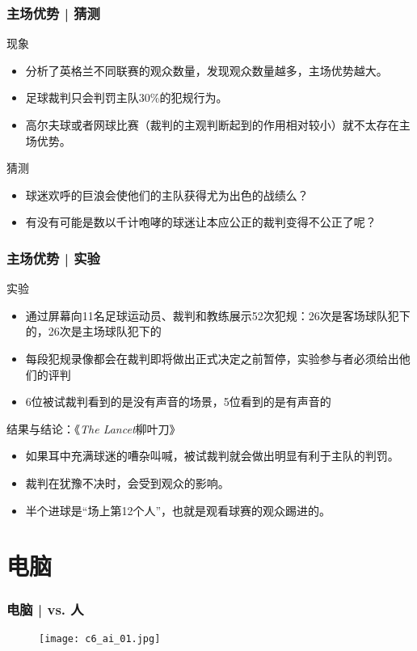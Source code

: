 \begin{frame}
  \frametitle{主场优势 | 猜测}
  \begin{block}{现象}
    \begin{itemize}
      \item 分析了英格兰不同联赛的观众数量，发现观众数量越多，主场优势越大。
      \item 足球裁判只会判罚主队30\%的犯规行为。
      \item 高尔夫球或者网球比赛（裁判的主观判断起到的作用相对较小）就不太存在主场优势。
    \end{itemize}
  \end{block}
  \pause
  \begin{block}{猜测}
    \begin{itemize}
      \item 球迷欢呼的巨浪会使他们的主队获得尤为出色的战绩么？
      \item 有没有可能是数以千计咆哮的球迷让本应公正的裁判变得不公正了呢？
    \end{itemize}
  \end{block}
\end{frame}

\begin{frame}
  \frametitle{主场优势 | 实验}
  \begin{block}{实验}
    \begin{itemize}
      \item 通过屏幕向11名足球运动员、裁判和教练展示52次犯规：26次是客场球队犯下的，26次是主场球队犯下的
      \item 每段犯规录像都会在裁判即将做出正式决定之前暂停，实验参与者必须给出他们的评判
      \item 6位被试裁判看到的是没有声音的场景，5位看到的是有声音的
    \end{itemize}
  \end{block}
  \pause
  \begin{block}{结果与结论：《\textit{The Lancet}柳叶刀》}
    \begin{itemize}
      \item 如果耳中充满球迷的嘈杂叫喊，被试裁判就会做出明显有利于主队的判罚。
      \item 裁判在犹豫不决时，会受到观众的影响。
      \item 半个进球是“场上第12个人”，也就是观看球赛的观众踢进的。
    \end{itemize}
  \end{block}
\end{frame}

\section{电脑}
\begin{frame}
  \frametitle{电脑 | vs. 人}
  \begin{figure}
    \centering
    \texttt{[image: c6\_ai\_01.jpg]}
  \end{figure}
\end{frame}


